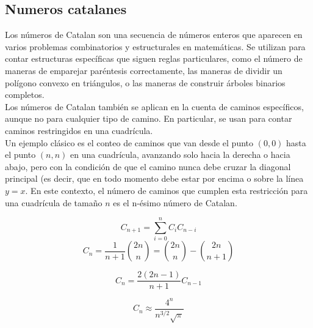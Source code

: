 \subsection{Numeros catalanes}
\begin{justify}
Los números de Catalan son una secuencia de números enteros que aparecen en varios problemas combinatorios y estructurales en matemáticas. Se utilizan para contar estructuras específicas que siguen reglas particulares, como el número de maneras de emparejar paréntesis correctamente, las maneras de dividir un polígono convexo en triángulos, o las maneras de construir árboles binarios completos.
\\
Los números de Catalan también se aplican en la cuenta de caminos específicos, aunque no para cualquier tipo de camino. En particular, se usan para contar caminos restringidos en una cuadrícula.
\\
Un ejemplo clásico es el conteo de caminos que van desde el punto $(0,0)$ hasta el punto $(n,n)$ en una cuadrícula, avanzando solo hacia la derecha o hacia abajo, pero con la condición de que el camino nunca debe cruzar la diagonal principal (es decir, que en todo momento debe estar por encima o sobre la línea $y = x$. En este contexto, el número de caminos que cumplen esta restricción para una cuadrícula de tamaño $n$ es el n-ésimo número de Catalan.
\end{justify}
\begin{equation*}
    C_{n+1} = \sum_{i=0}^nC_iC_{n-i}
\end{equation*}
\begin{equation*}
    C_n = \frac{1}{n+1}\binom{2n}{n} = \binom{2n}{n} - \binom{2n}{n+1}
\end{equation*}

\begin{equation*}
    C_n = \frac{2(2n-1)}{n+1} C_{n-1}
\end{equation*}

\begin{equation*}
    C_n \approx \frac{4^n}{n^{3/2}\sqrt{\pi}}
\end{equation*}

